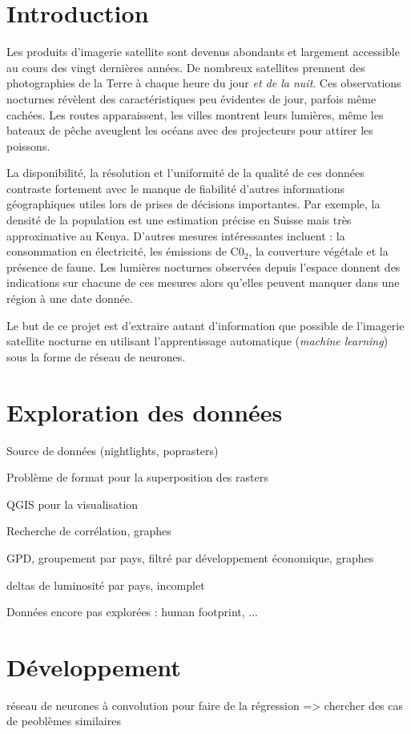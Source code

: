 \documentclass[a4paper]{report}
\begin{document}
\chapter{Introduction}
Les produits d'imagerie satellite sont devenus abondants et largement accessible au cours des vingt dernières années. De nombreux satellites prennent des photographies de la Terre à chaque heure du jour \textit{et de la nuit}. Ces observations nocturnes révèlent des caractéristiques peu évidentes de jour, parfois même cachées. Les routes apparaissent, les villes montrent leurs lumières, même les bateaux de pêche aveuglent les océans avec des projecteurs pour attirer les poissons.

La disponibilité, la résolution et l'uniformité de la qualité de ces données contraste fortement avec le manque de fiabilité d'autres informations géographiques utiles lors de prises de décisions importantes. Par exemple, la densité de la population est une estimation précise en Suisse mais très approximative au Kenya. D'autres mesures intéressantes incluent : la consommation en électricité, les émissions de C0$_2$, la couverture végétale et la présence de faune. Les lumières nocturnes observées depuis l'espace donnent des indications sur chacune de ces mesures alors qu'elles peuvent manquer dans une région à une date donnée.

Le but de ce projet est d'extraire autant d'information que possible de l'imagerie satellite nocturne en utilisant l'apprentissage automatique (\textit{machine learning}) sous la forme de réseau de neurones.

\chapter{Exploration des données}
Source de données (nightlights, poprasters)

Problème de format pour la superposition des rasters

QGIS pour la visualisation

Recherche de corrélation, graphes

GPD, groupement par pays, filtré par développement économique, graphes

deltas de luminosité par pays, incomplet

Données encore pas explorées : human footprint, ...

\chapter{Développement}
réseau de neurones à convolution pour faire de la régression => chercher des cas de peoblèmes similaires
\end{document}
